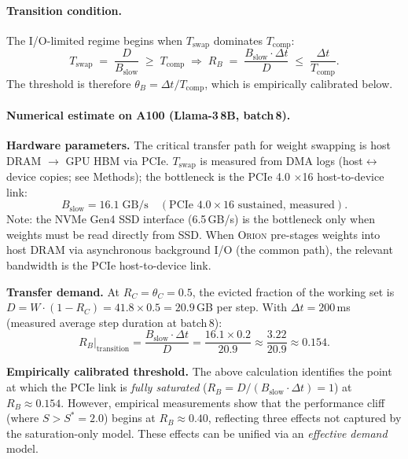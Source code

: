 \paragraph{Transition condition.}
The I/O-limited regime begins when $T_{\mathrm{swap}}$ dominates
$T_{\mathrm{comp}}$:
\begin{equation}
T_{\mathrm{swap}} \;=\; \frac{D}{B_{\mathrm{slow}}} \;\geq\; T_{\mathrm{comp}}
\;\Longrightarrow\;
R_B \;=\; \frac{B_{\mathrm{slow}} \cdot \Delta t}{D}
\;\leq\; \frac{\Delta t}{T_{\mathrm{comp}}}.
\label{eq:IO_cond}
\end{equation}
The threshold is therefore $\theta_B = \Delta t / T_{\mathrm{comp}}$, which
is empirically calibrated below.

\paragraph{Numerical estimate on A100 (Llama-3\,8B, batch\,8).}

\textbf{Hardware parameters.}
The critical transfer path for weight swapping is host DRAM $\to$ GPU HBM via
PCIe.
$T_{\mathrm{swap}}$ is measured from DMA logs (host$\leftrightarrow$device
copies; see Methods); the bottleneck is the PCIe 4.0 $\times$16 host-to-device
link:
\begin{equation}
B_{\mathrm{slow}} = 16.1\;\mathrm{GB/s} \quad
(\text{PCIe 4.0}\times\text{16 sustained, measured}).
\label{eq:bslow_A100}
\end{equation}
Note: the NVMe Gen4 SSD interface (6.5\,GB/s) is the bottleneck only when
weights must be read directly from SSD.
When \textsc{Orion} pre-stages weights into host DRAM via asynchronous
background I/O (the common path), the relevant bandwidth is the PCIe
host-to-device link.

\textbf{Transfer demand.}
At $R_C = \theta_C = 0.5$, the evicted fraction of the working set is
$D = W \cdot (1 - R_C) = 41.8 \times 0.5 = 20.9$\,GB per step.
With $\Delta t = 200$\,ms (measured average step duration at batch\,8):
\begin{equation}
R_B\big|_{\mathrm{transition}}
= \frac{B_{\mathrm{slow}} \cdot \Delta t}{D}
= \frac{16.1 \times 0.2}{20.9}
\approx \frac{3.22}{20.9}
\approx \mathbf{0.154}.
\label{eq:thetaB_A100}
\end{equation}

\textbf{Empirically calibrated threshold.}
The above calculation identifies the point at which the PCIe link is
\emph{fully saturated} ($R_B = D / (B_{\mathrm{slow}}\cdot\Delta t) = 1$)
at $R_B \approx 0.154$.
However, empirical measurements show that the performance cliff (where $S >
S^* = 2.0$) begins at $R_B \approx 0.40$, reflecting three effects not
captured by the saturation-only model.
These effects can be unified via an \emph{effective demand} model.

